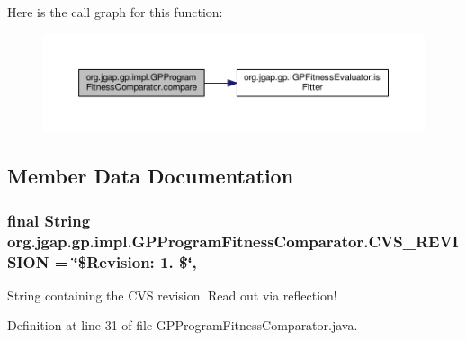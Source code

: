Here is the call graph for this function\-:
\nopagebreak
\begin{figure}[H]
\begin{center}
\leavevmode
\includegraphics[width=350pt]{classorg_1_1jgap_1_1gp_1_1impl_1_1_g_p_program_fitness_comparator_a6132392fd7160988e6f40907dfe6357d_cgraph}
\end{center}
\end{figure}




\subsection{Member Data Documentation}
\hypertarget{classorg_1_1jgap_1_1gp_1_1impl_1_1_g_p_program_fitness_comparator_aa7bfbeaeb169225fcc3ce8e55e071eb7}{
\subsubsection[{C\-V\-S\-\_\-\-R\-E\-V\-I\-S\-I\-O\-N}]{\setlength{\rightskip}{0pt plus 5cm}final String org.\-jgap.\-gp.\-impl.\-G\-P\-Program\-Fitness\-Comparator.\-C\-V\-S\-\_\-\-R\-E\-V\-I\-S\-I\-O\-N = \char`\"{}\$Revision\-: 1. \$\char`\"{}\hspace{0.3cm}{\ttfamily [static]}, {\ttfamily [private]}}}\label{classorg_1_1jgap_1_1gp_1_1impl_1_1_g_p_program_fitness_comparator_aa7bfbeaeb169225fcc3ce8e55e071eb7}
String containing the C\-V\-S revision. Read out via reflection! 

Definition at line 31 of file G\-P\-Program\-Fitness\-Comparator.\-java.

